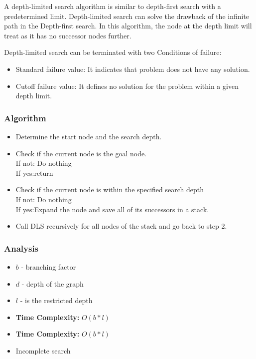 A depth-limited search algorithm is similar to depth-first search with a
predetermined limit. Depth-limited search can solve the drawback of the
infinite path in the Depth-first search. In this algorithm, the node at
the depth limit will treat as it has no successor nodes further.

Depth-limited search can be terminated with two Conditions of failure:

\begin{itemize}
      \item Standard failure value: It indicates that problem does not have any solution.
      \item Cutoff failure value: It defines no solution for the problem within a
            given depth limit.
\end{itemize}

\subsubsection*{Algorithm}

\begin{itemize}
      \item Determine the start node and the search depth.
      \item Check if the current node is the goal node. \\
            If not: Do nothing \\
            If yes:return
      \item Check if the current node is within the specified search depth \\
            If not: Do nothing \\
            If yes:Expand the node and save all of its successors in a stack.
      \item  Call DLS recursively for all nodes of the stack and go back to step 2.
\end{itemize}

\subsubsection*{Analysis}

\begin{itemize}
      \item $b$ - branching factor
      \item $d$ - depth of the graph
      \item $l$ - is the restricted depth
      \item \textbf{Time Complexity:} $O(b*l)$
      \item \textbf{Time Complexity:} $O(b*l)$
      \item Incomplete search
\end{itemize}